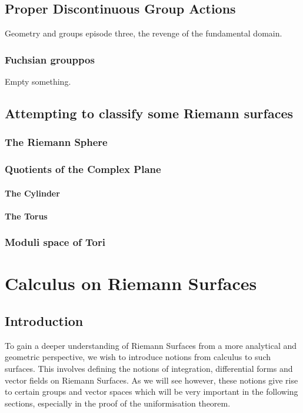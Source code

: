 \documentclass[a4paper,12pt]{report}
\theoremstyle{plain}
\theoremstyle{definition}
\begin{document}
\section{Proper Discontinuous Group Actions}\label{PropDiscGrpAct}
Geometry and groups episode three, the revenge of the fundamental domain.
\subsection{Fuchsian grouppos}
Empty something.

\section{Attempting to classify some Riemann surfaces}
\subsection{The Riemann Sphere}
\subsection{Quotients of the Complex Plane}
\subsubsection{The Cylinder}
\subsubsection{The Torus}
\subsection{Moduli space of Tori}

\chapter{Calculus on Riemann Surfaces}
\section{Introduction}
To gain a deeper understanding of Riemann Surfaces from a more analytical
and geometric perspective, we wish to introduce notions from calculus to
such surfaces. This involves defining the notions of integration,
differential forms and vector fields on Riemann Surfaces. As we will see
however, these notions give rise to certain groups and vector spaces
which will be very important in the following sections, especially in the
proof of the uniformisation theorem.
\end{document}
